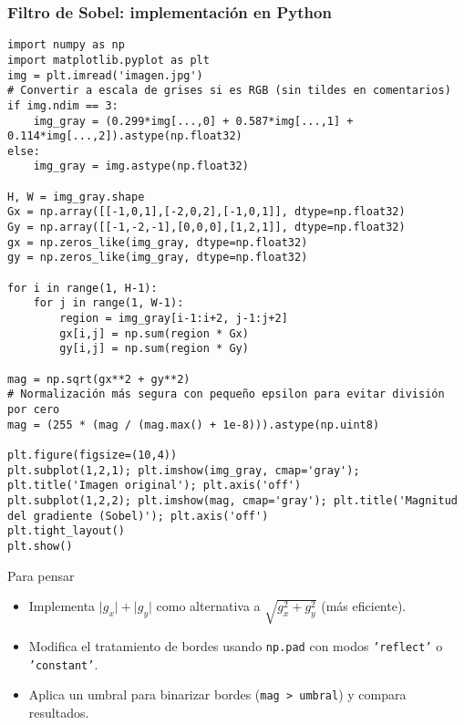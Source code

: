 \documentclass[10pt]{beamer}
\begin{document}
\begin{frame}[fragile]
\frametitle{Filtro de Sobel: implementaci\'on en Python}
{\scriptsize
\begin{verbatim}
import numpy as np
import matplotlib.pyplot as plt
img = plt.imread('imagen.jpg')
# Convertir a escala de grises si es RGB (sin tildes en comentarios)
if img.ndim == 3:
    img_gray = (0.299*img[...,0] + 0.587*img[...,1] + 0.114*img[...,2]).astype(np.float32)
else:
    img_gray = img.astype(np.float32)

H, W = img_gray.shape
Gx = np.array([[-1,0,1],[-2,0,2],[-1,0,1]], dtype=np.float32)
Gy = np.array([[-1,-2,-1],[0,0,0],[1,2,1]], dtype=np.float32)
gx = np.zeros_like(img_gray, dtype=np.float32)
gy = np.zeros_like(img_gray, dtype=np.float32)

for i in range(1, H-1):
    for j in range(1, W-1):
        region = img_gray[i-1:i+2, j-1:j+2]
        gx[i,j] = np.sum(region * Gx)
        gy[i,j] = np.sum(region * Gy)

mag = np.sqrt(gx**2 + gy**2)
# Normalización más segura con pequeño epsilon para evitar división por cero
mag = (255 * (mag / (mag.max() + 1e-8))).astype(np.uint8)

plt.figure(figsize=(10,4))
plt.subplot(1,2,1); plt.imshow(img_gray, cmap='gray'); plt.title('Imagen original'); plt.axis('off')
plt.subplot(1,2,2); plt.imshow(mag, cmap='gray'); plt.title('Magnitud del gradiente (Sobel)'); plt.axis('off')
plt.tight_layout()
plt.show()
\end{verbatim}
}
\vspace{-2mm}
\begin{block}{Para pensar}
\begin{itemize}
  \item Implementa $\lvert g_x\rvert+\lvert g_y\rvert$ como alternativa a $\sqrt{g_x^2+g_y^2}$ (más eficiente).
  \item Modifica el tratamiento de bordes usando \texttt{np.pad} con modos \texttt{'reflect'} o \texttt{'constant'}.
  \item Aplica un umbral para binarizar bordes (\texttt{mag > umbral}) y compara resultados.
\end{itemize}
\end{block}
\end{frame}
\end{document}
